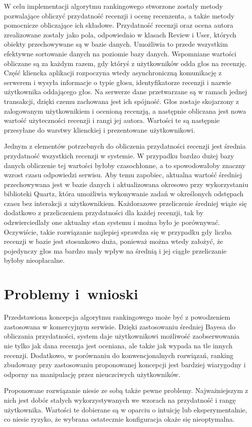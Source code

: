 W celu implementacji algorytmu rankingowego stworzone zostały metody pozwalające obliczyć przydatność recenzji i ocenę recenzenta, a także metody pomocnicze obliczające ich składowe. Przydatność recenzji oraz ocena autora zrealizowane zostały jako pola, odpowiednio w klasach Review i User, których obiekty przechowywane są w bazie danych. Umożliwia to przede wszystkim efektywne sortowanie danych na poziomie bazy danych. Wspomniane wartości obliczane są za każdym razem, gdy któryś z użytkowników odda głos na recenzję. Część kliencka aplikacji rozpoczyna wtedy asynchroniczną komunikację z serwerem i wysyła informacje o typie głosu, identyfikatorze recenzji i nazwie użytkownika oddającego głos. Na serwerze dane przetwarzane są w ramach jednej transakcji\cite{springAction}, dzięki czemu zachowana jest ich spójność. Głos zostaje skojarzony z zalogowanym użytkownikiem i ocenioną recenzją, a następnie obliczana jest nowa wartość użyteczności recenzji i rangi jej autora. Wartości te są następnie przesyłane do warstwy klienckiej i prezentowane użytkownikowi.

Jednym z elementów potrzebnych do obliczenia przydatności recenzji jest średnia przydatność wszystkich recenzji w systemie. W przypadku bardzo dużej bazy danych obliczenie tej wartości byłoby czasochłonne, a to spowodowałoby znaczny wzrost czasu odpowiedzi serwisu. Aby temu zapobiec, aktualna wartość średniej przechowywana jest w bazie danych i aktualizowana okresowo przy wykorzystaniu biblioteki Quartz, która umożliwia wykonywanie zadań w określonych odstępach czasu bez interakcji z użytkownikiem.\cite{quartz} Każdorazowe przeliczenie średniej wiąże się dodatkowo z przeliczeniem przydatności dla każdej recenzji, tak by odzwierciedlały one aktualny stan systemu i można było je porównywać. Oczywiście, takie rozwiązanie najlepiej sprawdza się w przypadku gdy liczba  recenzji w bazie jest stosunkowo duża, ponieważ można wtedy założyć, że pojedynczy głos ma bardzo mały wpływ na średnią i jej ciągłe przeliczanie byłoby nieopłacalne.

\section{Problemy i~wnioski}

Przedstawiona koncepcja algorytmu rankingowego może być z powodzeniem zastosowana w komercyjnym serwisie. Dzięki zastosowaniu średniej Bayesa do obliczania przydatności, system daje użytkownikowi możliwość zaobserwowania nie tylko jak dana recenzja jest oceniana, ale także jak wypada na tle innych recenzji. Dodatkowo, w porównaniu do konwencjonalnych rozwiązań, ranking zbudowany przy zastosowaniu proponowanej koncepcji jest bardziej wiarygodny i odporny na manipulację przez nieuczciwych użytkowników.

Proponowane rozwiązanie niesie ze sobą także pewne problemy. Najważniejszym z nich jest dobór stałych wykorzystywanych we wzorach na przydatność i rangę użytkownika. Wartości te dobierane są w oparciu o intuicję lub eksperymentalnie, co niesie ryzyko, że wybrana ostatecznie konfiguracja okaże się nieoptymalna.
